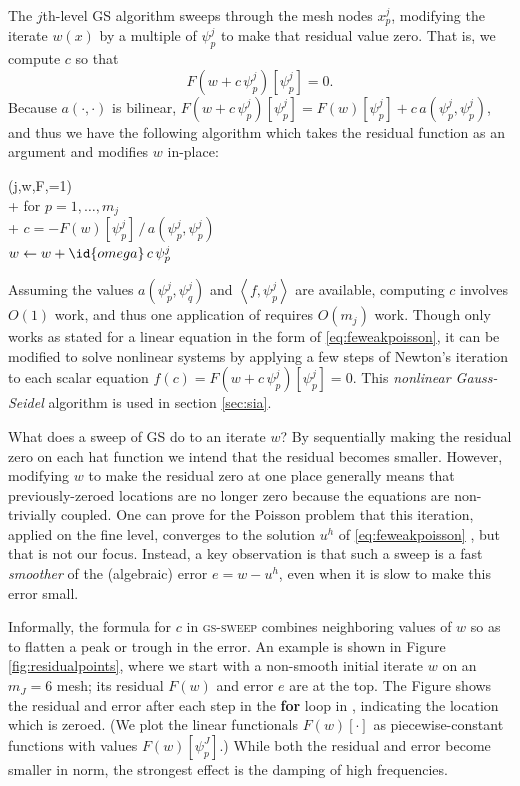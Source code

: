 \documentclass[letterpaper,final,12pt,reqno]{amsart}
\theoremstyle{claim}
\newcommand{\ip}[2]{\left<#1,#2\right>}
\numberwithin{equation}{section}
\numberwithin{figure}{section}
\numberwithin{table}{section}
\numberwithin{theorem}{section}
\begin{document}
The $j$th-level GS algorithm sweeps through the mesh nodes $x_p^j$, modifying the iterate $w(x)$ by a multiple of $\psi_p^j$ to make that residual value zero.  That is, we compute $c$ so that
\begin{equation}
  F(w+c\,\psi_p^j)[\psi_p^j] = 0.  \label{eq:gaussseidelpoint}
\end{equation}
Because $a(\cdot,\cdot)$ is bilinear, $F(w+c\,\psi_p^j)[\psi_p^j] = F(w)[\psi_p^j] + c\, a(\psi_p^j,\psi_p^j)$, and thus we have the following algorithm which takes the residual function as an argument and modifies $w$ in-place:
\begin{pseudo*} \label{ps:gs-sweep}
(j,w,F,=1)\text{:} \\+
    for $p=1,\dots,m_j$ \\+
        $\displaystyle c = - F(w)[\psi_p^j]\, \big/ \,a(\psi_p^j,\psi_p^j)$  \\
        $w \gets w + \id{omega} \,c \,\psi_p^j$
\end{pseudo*}

Assuming the values $a(\psi_p^j,\psi_q^j)$ and $\ip{f}{\psi_p^j}$ are available, computing $c$ involves $O(1)$ work, and thus one application of  requires $O(m_j)$ work.  Though  only works as stated for a linear equation in the form of \eqref{eq:feweakpoisson}, it can be modified to solve nonlinear systems by applying a few steps of Newton's iteration to each scalar equation $f(c) = F(w+c\,\psi_p^j)[\psi_p^j] = 0$.  This \emph{nonlinear Gauss-Seidel} algorithm is used in section \ref{sec:sia}.

What does a sweep of GS do to an iterate $w$?  By sequentially making the residual zero on each hat function we intend that the residual becomes smaller.  However, modifying $w$ to make the residual zero at one place generally means that previously-zeroed locations are no longer zero because the equations are non-trivially coupled.  One can prove for the Poisson problem that this iteration, applied on the fine level, converges to the solution $u^h$ of \eqref{eq:feweakpoisson} \cite[for example]{Greenbaum1997}, but that is not our focus.  Instead, a key observation is that such a sweep is a fast \emph{smoother} of the (algebraic) error $e=w-u^h$, even when it is slow to make this error small.

Informally, the formula for $c$ in \textsc{gs-sweep} combines neighboring values of $w$ so as to flatten a peak or trough in the error.  An example is shown in Figure \ref{fig:residualpoints}, where we start with a non-smooth initial iterate $w$ on an $m_J=6$ mesh; its residual $F(w)$ and error $e$ are at the top.  The Figure shows the residual and error after each step in the \textbf{for} loop in , indicating the location which is zeroed.  (We plot the linear functionals $F(w)[\cdot]$ as piecewise-constant functions with values $F(w)[\psi_p^J]$.)  While both the residual and error become smaller in norm, the strongest effect is the damping of high frequencies.
\end{document}
